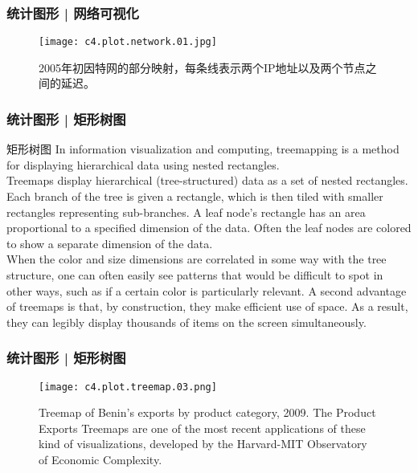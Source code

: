 \begin{frame}
  \frametitle{统计图形 | 网络可视化}
  \begin{figure}
    \centering
    \texttt{[image: c4.plot.network.01.jpg]}
    \caption{{\footnotesize 2005年初因特网的部分映射，每条线表示两个IP地址以及两个节点之间的延迟。}}
  \end{figure}
\end{frame}

\begin{frame}
  \frametitle{统计图形 | 矩形树图}
  \begin{block}{矩形树图}
    In information visualization and computing, treemapping is a method for displaying hierarchical data using nested rectangles.\\
    \vspace{0.5em}
Treemaps display hierarchical (tree-structured) data as a set of nested rectangles. Each branch of the tree is given a rectangle, which is then tiled with smaller rectangles representing sub-branches. A leaf node's rectangle has an area proportional to a specified dimension of the data. Often the leaf nodes are colored to show a separate dimension of the data.\\
\vspace{0.5em}
When the color and size dimensions are correlated in some way with the tree structure, one can often easily see patterns that would be difficult to spot in other ways, such as if a certain color is particularly relevant. A second advantage of treemaps is that, by construction, they make efficient use of space. As a result, they can legibly display thousands of items on the screen simultaneously.
  \end{block}
\end{frame}

\begin{frame}
  \frametitle{统计图形 | 矩形树图}
  \begin{figure}
    \centering
    \texttt{[image: c4.plot.treemap.03.png]}
    \caption{{\footnotesize Treemap of Benin's exports by product category, 2009. The Product Exports Treemaps are one of the most recent applications of these kind of visualizations, developed by the Harvard-MIT Observatory of Economic Complexity.}}
  \end{figure}
\end{frame}

